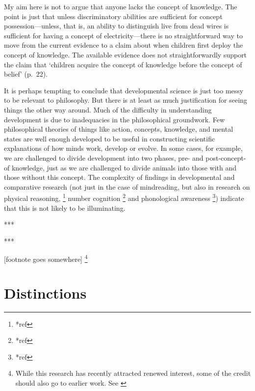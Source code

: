 \documentclass[11pt,a4paper]{extarticle}
\begin{document}
My aim here is not to argue that anyone lacks the concept of knowledge.
The point is just that unless discriminatory abilities are sufficient for  concept possession---unless, that is, an ability to distinguish live from dead wires is sufficient for having a concept of electricity---there is no straightforward way to move from the current evidence to a claim about when children first deploy the concept of knowledge.
The available evidence does not  straightforwardly support the claim that `children acquire the concept of knowledge before the concept of belief' (p.\ 22).

It is perhaps tempting to conclude that developmental science is just too messy to be relevant to philosophy.
But there is at least as much justification for seeing things the other way around.
Much of the difficulty in understanding development is due to inadequacies in the philosophical groundwork.
Few philosophical theories of things like action, concepts, knowledge, and mental states are well enough developed to be useful in constructing scientific explanations of how minds work, develop or evolve.
In some cases, for example, we are challenged to divide development into two phases, pre- and post-concept-of knowledge, just as we are challenged to divide animals into those with and those without this concept.
The complexity of findings in developmental and comparative research (not just in the case of mindreading, but also in research on physical reasoning,%
\footnote{
*ref
}
number cognition%
\footnote{
*ref
}
and phonological awareness%
\footnote{
*ref
}) 
indicate that this is not likely to be illuminating.





***

***

[footnote goes somewhere]%
\footnote{
While this research has recently attracted renewed interest, some of the credit should also go to earlier work. 
See \citet{Clements:1994cw,Garnham:2001jm,Garnham:2001ql,Ruffman:2001ng}
}


%

 
 

\section{Distinctions}
\end{document}
